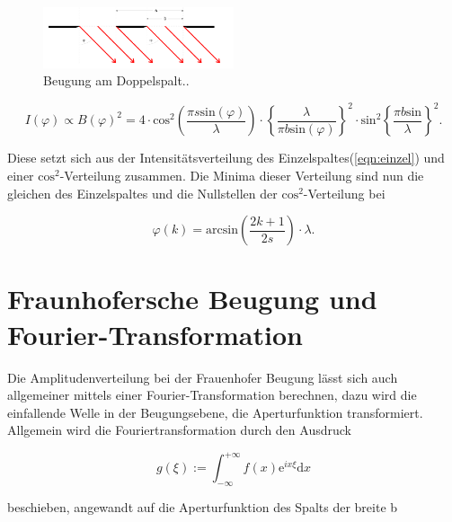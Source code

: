         \begin{figure}[ht]
            \centering
            \includegraphics[width=0.5\textwidth]{latex/images/Doppelspalt.PNG}
            \caption{Beugung am Doppelspalt.\protect \cite{V406}.}
            \label{img:Doppelspalt}
        \end{figure}

        \begin{equation}
            I(\varphi) \propto B(\varphi)^2 = 4 \cdot \text{cos}^2 \left( \frac{\pi s \text{sin}(\varphi)}{\lambda} \right) \cdot 
            \left\{ \frac{\lambda}{\pi b \text{sin}(\varphi)} \right\}^2 \cdot \text{sin}^2 \left\{ \frac{ \pi b \text{sin}}{\lambda} \right\}^2 .
        \end{equation}

        \noindent Diese setzt sich aus der Intensitätsverteilung des Einzelspaltes(\ref{eqn:einzel}) und einer $\text{cos}^2$-Verteilung zusammen. Die 
        Minima dieser Verteilung sind nun die gleichen des Einzelspaltes und die Nullstellen der $\text{cos}^2$-Verteilung bei 

        \begin{equation*}
            \varphi(k) = \text{arcsin}\left( \frac{2k +1 }{2s} \right) \cdot \lambda .
        \end{equation*}

    \section{Fraunhofersche Beugung und Fourier-Transformation}

        \noindent Die Amplitudenverteilung bei der Frauenhofer Beugung lässt sich auch allgemeiner mittels einer Fourier-Transformation 
        berechnen, dazu wird die einfallende Welle in der Beugungsebene, die Aperturfunktion transformiert.
        Allgemein wird die Fouriertransformation durch den Ausdruck 

        \begin{equation}
            \label{eqn:Fourier}
            g(\xi) := \int_{-\infty}^{+\infty} f(x) \text{e}^{i x \xi} \text{d}x
        \end{equation}

        \noindent beschieben, angewandt auf die Aperturfunktion des Spalts der breite b 

